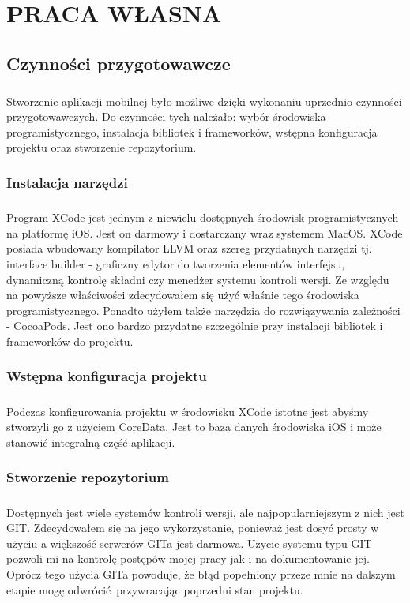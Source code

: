 \documentclass[]{report}
\begin{document}
\chapter{PRACA WŁASNA}
\section{Czynności przygotowawcze}		
\paragraph{}Stworzenie aplikacji mobilnej było możliwe dzięki wykonaniu uprzednio czynności przygotowawczych. Do czynności tych należało: wybór środowiska programistycznego, instalacja bibliotek i frameworków, wstępna konfiguracja projektu oraz stworzenie repozytorium.
\subsection{Instalacja narzędzi}
\paragraph{}Program XCode jest jednym z niewielu dostępnych środowisk programistycznych na platformę iOS. Jest on darmowy i dostarczany wraz systemem MacOS. XCode posiada wbudowany kompilator LLVM oraz szereg przydatnych narzędzi tj. interface builder - graficzny edytor do tworzenia elementów interfejsu, dynamiczną kontrolę składni czy menedżer systemu kontroli wersji. Ze względu na powyższe właściwości zdecydowałem się użyć właśnie tego środowiska programistycznego.
Ponadto użyłem także narzędzia do rozwiązywania zależności - CocoaPods. Jest ono bardzo przydatne szczególnie przy instalacji bibliotek i frameworków do projektu.  
\subsection{Wstępna konfiguracja projektu}
\paragraph{}Podczas konfigurowania projektu w środowisku XCode istotne jest abyśmy stworzyli go z użyciem CoreData. Jest to baza danych środowiska iOS i może stanowić integralną część aplikacji.   
\subsection{Stworzenie repozytorium}
\paragraph{}Dostępnych jest wiele systemów kontroli wersji, ale najpopularniejszym z nich jest GIT. Zdecydowałem się na jego wykorzystanie, ponieważ jest dosyć prosty w użyciu a większość serwerów GITa jest darmowa. Użycie systemu typu GIT pozwoli mi na kontrolę postępów mojej pracy jak i na dokumentowanie jej. Oprócz tego użycia GITa powoduje, że błąd popełniony przeze mnie na dalszym etapie mogę odwrócić przywracając poprzedni stan projektu.
\end{document}
